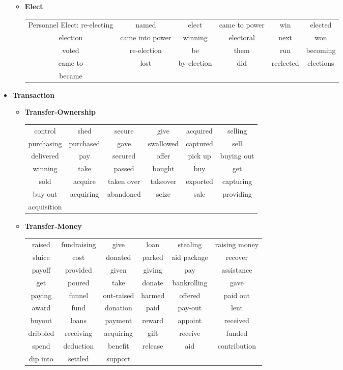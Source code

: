 \documentclass[11pt, oneside]{article}   	%
\begin{document}
\begin{itemize}
\begin{itemize}
\begin{tabular}{ c c c c c c }
		\end{tabular}
		\item[] \textbf{Elect} \\
		 \begin{tabular}{ c c c c c c }
		Personnel Elect: re-electing & named & elect & came to power & win & elected\\election & came into power & winning & electoral & next & won\\voted & re-election & be & them & run & becoming\\came
to & lost & by-election & did & reelected & elections\\became
		\end{tabular}
	\end{itemize}

\clearpage
\item[] \textbf{Transaction} 
	\vspace*{-0.2cm}
	\begin{itemize}
	\item[] \textbf{Transfer-Ownership} \\
		 \begin{tabular}{ c c c c c c }
		 control & shed & secure & give & acquired & selling\\purchasing & purchased & gave & swallowed & captured & sell\\delivered & pay & secured & offer & pick up & buying out\\winning & take & passed & bought & buy & get\\sold & acquire & taken over & takeover & exported & capturing\\buy out & acquiring & abandoned & seize & sale & providing\\acquisition
		\end{tabular}
	\item[] \textbf{Transfer-Money} \\
		 \begin{tabular}{ c c c c c c }
		 raised & fundraising & give & loan & stealing & raising money\\sluice & cost & donated & parked & aid
package & recover\\payoff & provided & given & giving & pay & assistance\\get & poured & take & donate & bankrolling & gave\\paying & funnel & out-raised & harmed & offered & paid out\\award & fund & donation & paid & pay-out & lent\\buyout & loans & payment & reward & appoint & received\\dribbled & receiving & acquiring & gift & receive & funded\\spend & deduction & benefit & release & aid & contribution\\dip into & settled & support					\end{tabular}
	\end{itemize}

		
\end{itemize}
\end{document}
